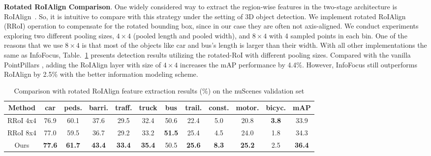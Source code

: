 \documentclass[runningheads]{llncs}
\begin{document}
\noindent\textbf{Rotated RoIAlign Comparison}.
One widely considered way to extract the region-wise features in the two-stage architecture is RoIAlign~\cite{he2017mask}. So, it is intuitive to compare with this strategy under the setting of 3D object detection. We implement rotated RoIAlign (RRoI) operation \cite{huang2018improving} to compensate for the rotated bounding box, since in our case they are often not axis-aligned. We conduct experiments exploring two different pooling sizes, $4 \times 4$ (pooled length and pooled width), and $8 \times 4$ with 4 sampled points in each bin. One of the reasons that we use $8 \times 4$ is that most of the objects like car and bus's length is larger than their width. With all other implementations the same as InfoFocus, Table.~\ref{table:5} presents detection results utilizing the rotated-RoI with different pooling sizes. Compared with the vanilla PointPillars \cite{lang2019PointPillars}, adding the RoIAlign layer with size of $4 \times 4$ increases the mAP performance by 4.4\%. However, InfoFocus still outperforms RoIAlign by 2.5\% with the better information modeling scheme. 

\begin{table}[h!]
\centering
\caption{Comparison with rotated RoIAlign feature extraction results (\%) on the nuScenes validation set}
\begin{tabular}{c c c c c c c c c c c c} 
 \hline
 Method & car & peds. & barri. & traff. & truck & bus & trail. & const. & motor. & bicyc. & mAP \\ [0.5ex] 
 \hline
  RRoI 4x4 & 76.9 & 60.1 & 37.6 & 29.5 & 32.4 & 50.6 & 22.4 & 5.0 & 20.8 & \bf 3.8 & 33.9\\
  RRoI 8x4 & 77.0 & 59.5 & 36.7 & 29.2 & 33.2 & \bf 51.5 & 25.4 & 4.5 & 24.0 & 1.8 & 34.3\\ 
  \hline
  Ours & \bf 77.6 & \bf 61.7 & \bf 43.4 & \bf 33.4 & \bf 35.4 & 50.5 & \bf 25.6 & \bf 8.3 & \bf 25.2 & 2.5 & \bf 36.4 \\ 
 \hline
\end{tabular}
\label{table:5}
\end{table}
\end{document}
